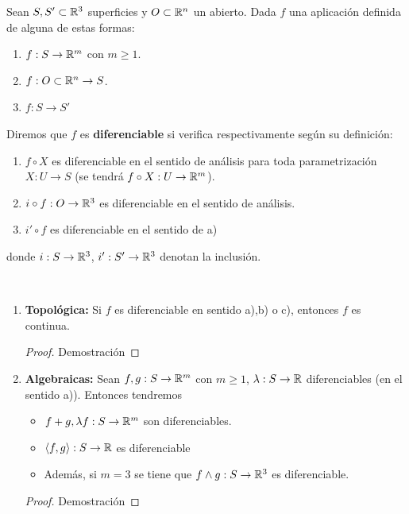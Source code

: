
\begin{definicion}
    Sean $S,S'\subset \mathbb{R}^3$ superficies y $O\subset \mathbb{R}^n$ un abierto. Dada $f$ una aplicación definida de alguna de estas formas:
    \begin{enumerate}
        \item[a)] $f:S\to \mathbb{R}^m$ con $m\geq 1$.
        \item[b)] $f:O\subset \mathbb{R}^n \to S$.
        \item[c)] $f:S \to S'$
    \end{enumerate}
    Diremos que $f$ es \textbf{diferenciable} si verifica respectivamente según su definición:
    \begin{enumerate}
        \item[a)] $f \circ X$ es diferenciable en el sentido de análisis para toda parametrización $X:U\to S$ (se tendrá $f \circ X: U\to \mathbb{R}^m$).
        \item[b)] $i \circ f: O\to \mathbb{R}^3$ es diferenciable en el sentido de análisis.
        \item[c)] $i' \circ f$ es diferenciable en el sentido de a)
    \end{enumerate}
    donde $i:S \to \mathbb{R}^3$, $i':S' \to \mathbb{R}^3$ denotan la inclusión.
\end{definicion}

\begin{propiedades}\
    \begin{enumerate}
        \item \textbf{Topológica:} Si $f$ es diferenciable en sentido a),b) o c), entonces $f$ es continua. 
        \begin{proof}
            Demostración
        \end{proof}
        \item \textbf{Algebraicas:} Sean $f,g:S\to \mathbb{R}^m$ con $m\geq 1$, $\lambda: S\to \mathbb{R}$ diferenciables (en el sentido a)). Entonces tendremos
        \begin{itemize}
            \item $f+g, \lambda f: S\to \mathbb{R}^m$ son diferenciables.
            \item $\langle f,g \rangle: S\to \mathbb{R}$ es diferenciable
            \item Además, si $m=3$ se tiene que $f \wedge g:S \to \mathbb{R}^3$ es diferenciable.
        \end{itemize}
        \begin{proof}
            Demostración
        \end{proof}
    \end{enumerate}
\end{propiedades}

